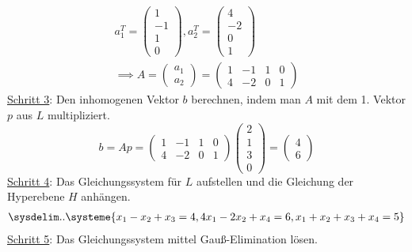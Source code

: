 \begin{gather*}
    a_1^T=\begin{pmatrix}
        1\\-1\\1\\0
    \end{pmatrix}, a_2^T =\begin{pmatrix}
        4\\-2\\0\\1
    \end{pmatrix}\\
    \implies A = \begin{pmatrix}
        a_1\\a_2
    \end{pmatrix}=\begin{pmatrix}
        1 & -1 & 1 & 0\\
        4 & -2 & 0 & 1
    \end{pmatrix}
\end{gather*}
\underline{Schritt 3}: Den inhomogenen Vektor $b$ berechnen, indem man $A$ mit dem 1. Vektor $p$ aus $L$ multipliziert.
\[
    b = Ap = \begin{pmatrix}
        1 & -1 & 1 & 0\\
        4 & -2 & 0 & 1
    \end{pmatrix}\begin{pmatrix}
        2\\ 1\\3\\0
    \end{pmatrix} = \begin{pmatrix}
        4\\6
    \end{pmatrix}
\]
\underline{Schritt 4}: Das Gleichungssystem für $L$ aufstellen und die Gleichung der Hyperebene $H$ anhängen.
\begin{gather*}
    \sysdelim..
    \systeme{
        x_1 - x_2 + x_3 = 4,
        4x_1 - 2x_2 + x_4 = 6,
        x_1 + x_2 + x_3 + x_4 = 5
    }
\end{gather*}
\underline{Schritt 5}: Das Gleichungssystem mittel Gauß-Elimination lösen.
